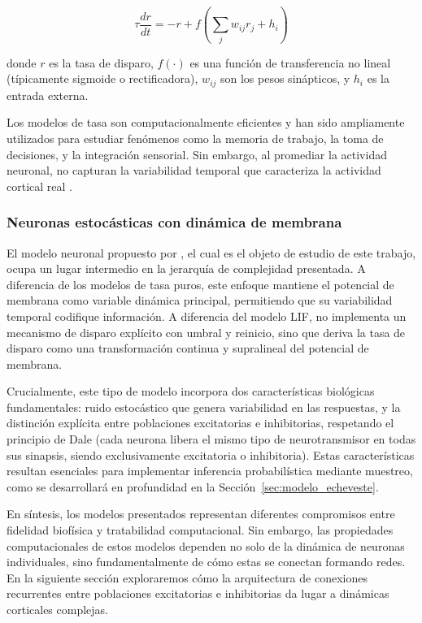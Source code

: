 \begin{equation}
\tau \frac{dr}{dt} = -r + f\left(\sum_j w_{ij} r_j + h_i\right)
\label{eq:rate_model}
\end{equation}

donde $r$ es la tasa de disparo, $f(\cdot)$ es una función de transferencia no lineal (típicamente sigmoide o rectificadora), $w_{ij}$ son los pesos sinápticos, y $h_i$ es la entrada externa.

Los modelos de tasa son computacionalmente eficientes y han sido ampliamente utilizados para estudiar fenómenos como la memoria de trabajo, la toma de decisiones, y la integración sensorial. Sin embargo, al promediar la actividad neuronal, no capturan la variabilidad temporal que caracteriza la actividad cortical real \citep{gerstner2002spiking}.

\subsubsection{Neuronas estocásticas con dinámica de membrana}

El modelo neuronal propuesto por \cite{echeveste2020cortical}, el cual es el objeto de estudio de este trabajo, ocupa un lugar intermedio en la jerarquía de complejidad presentada. A diferencia de los modelos de tasa puros, este enfoque mantiene el potencial de membrana como variable dinámica principal, permitiendo que su variabilidad temporal codifique información. A diferencia del modelo LIF, no implementa un mecanismo de disparo explícito con umbral y reinicio, sino que deriva la tasa de disparo como una transformación continua y supralineal del potencial de membrana.

Crucialmente, este tipo de modelo incorpora dos características biológicas fundamentales: ruido estocástico que genera variabilidad en las respuestas, y la distinción explícita entre poblaciones excitatorias e inhibitorias, respetando el principio de Dale (cada neurona libera el mismo tipo de neurotransmisor en todas sus sinapsis, siendo exclusivamente excitatoria o inhibitoria). Estas características resultan esenciales para implementar inferencia probabilística mediante muestreo, como se desarrollará en profundidad en la Sección~\ref{sec:modelo_echeveste}.

En síntesis, los modelos presentados representan diferentes compromisos entre fidelidad biofísica y tratabilidad computacional. Sin embargo, las propiedades computacionales de estos modelos dependen no solo de la dinámica de neuronas individuales, sino fundamentalmente de cómo estas se conectan formando redes. En la siguiente sección exploraremos cómo la arquitectura de conexiones recurrentes entre poblaciones excitatorias e inhibitorias da lugar a dinámicas corticales complejas.

